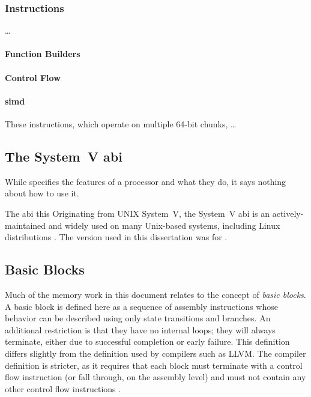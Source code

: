 \subsubsection{Instructions}
\todo\dots

\paragraph{Function Builders}

\paragraph{Control Flow}

\paragraph{\ac{simd}}
These instructions, which operate on multiple 64-bit chunks,
\todo\dots

\subsection{The System~V \acs*{abi}}
While  specifies the features of a processor and what they do,
it says nothing about how to use it.



The \ac{abi} this 
Originating from UNIX System~V, the System~V \ac{abi}
is an actively-maintained and widely used on many Unix-based systems,
including Linux distributions \autocite{systemv-ABI-git}.
The version used in this dissertation was for \arch.

\subsection{Basic Blocks}
Much of the memory work in this document relates to the concept of \emph{basic blocks}.%
A basic block is defined here as a sequence of assembly instructions
whose behavior can be described using only state transitions and branches.
An additional restriction is that they have no internal loops;
they will always terminate, either due to successful completion or early failure.
This definition differs slightly from the definition used by compilers such as LLVM.
The compiler definition is stricter, as it requires that
each block must terminate with a control flow instruction
(or fall through, on the assembly level)
and must not contain any other control flow instructions
\autocite{llvm:functions,llvm:terminators}.

